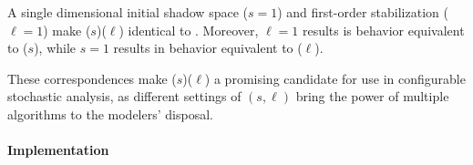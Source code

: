 A single dimensional initial shadow space ($s = 1$) and first-order
stabilization ($\ell = 1$) make
($s$)($\ell$) identical to
. Moreover, $\ell = 1$ results is behavior equivalent
to ($s$), while $s = 1$ results in behavior equivalent to
($\ell$).

These correspondences make ($s$)($\ell$) a
promising candidate for use in configurable stochastic analysis, as
different settings of $(s, \ell)$ bring the power of multiple
algorithms to the modelers' disposal.

\paragraph{Implementation}

